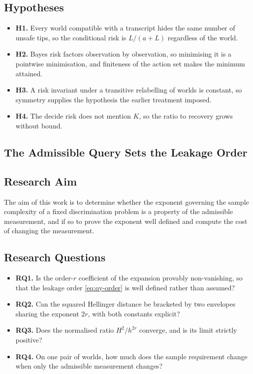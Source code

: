 \documentclass[conference]{IEEEtran}
\theoremstyle{definition}
\begin{document}
\subsection{Hypotheses}

\begin{itemize}
\item \textbf{H1.} Every world compatible with a transcript hides the same number of unsafe
tips, so the conditional risk is $L/(a+L)$ regardless of the world.
\item \textbf{H2.} Bayes risk factors observation by observation, so minimising it is a
pointwise minimisation, and finiteness of the action set makes the minimum attained.
\item \textbf{H3.} A risk invariant under a transitive relabelling of worlds is constant, so
symmetry supplies the hypothesis the earlier treatment imposed.
\item \textbf{H4.} The decide risk does not mention $K$, so the ratio to recovery grows
without bound.
\end{itemize}


\subsection{The Admissible Query Sets the Leakage Order}

\subsection{Research Aim}

The aim of this work is to determine whether the exponent governing the sample complexity of
a fixed discrimination problem is a property of the admissible measurement, and if so to
prove the exponent well defined and compute the cost of changing the measurement.

\subsection{Research Questions}

\begin{itemize}
\item \textbf{RQ1.} Is the order-$r$ coefficient of the expansion provably non-vanishing, so
that the leakage order \eqref{eq:qy-order} is well defined rather than assumed?
\item \textbf{RQ2.} Can the squared Hellinger distance be bracketed by two envelopes sharing
the exponent $2r$, with both constants explicit?
\item \textbf{RQ3.} Does the normalised ratio $H^{2}/h^{2r}$ converge, and is its limit
strictly positive?
\item \textbf{RQ4.} On one pair of worlds, how much does the sample requirement change when
only the admissible measurement changes?
\end{itemize}
\end{document}
